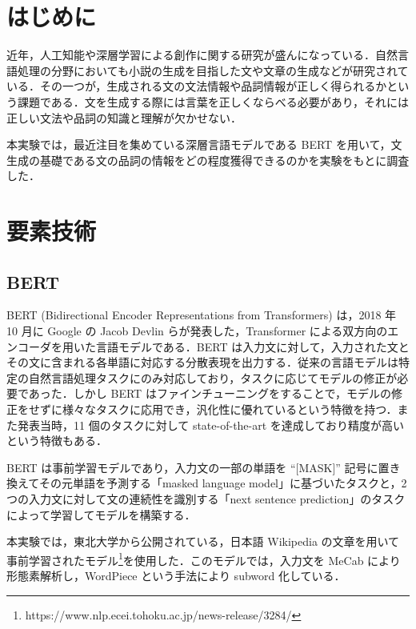 \documentclass[twocolumn]{jarticle}
\begin{document}

\section{はじめに}
近年，人工知能や深層学習による創作に関する研究が盛んになっている．自然言語処理の分野においても小説の生成を目指した文や文章の生成などが研究されている．その一つが，生成される文の文法情報や品詞情報が正しく得られるかという課題である．文を生成する際には言葉を正しくならべる必要があり，それには正しい文法や品詞の知識と理解が欠かせない．\par
本実験では，最近注目を集めている深層言語モデルである BERT を用いて，文生成の基礎である文の品詞の情報をどの程度獲得できるのかを実験をもとに調査した．


\section{要素技術}

  \subsection{BERT}
BERT (Bidirectional Encoder Representations from Transformers)\cite{DBLP} は，2018 年 10 月に Google の Jacob Devlin らが発表した，Transformer による双方向のエンコーダを用いた言語モデルである．BERT は入力文に対して，入力された文とその文に含まれる各単語に対応する分散表現を出力する．従来の言語モデルは特定の自然言語処理タスクにのみ対応しており，タスクに応じてモデルの修正が必要であった．しかし BERT はファインチューニングをすることで，モデルの修正をせずに様々なタスクに応用でき，汎化性に優れているという特徴を持つ．また発表当時，11 個のタスクに対して state-of-the-art を達成しており精度が高いという特徴もある．\par
BERT は事前学習モデルであり，入力文の一部の単語を “[MASK]” 記号に置き換えてその元単語を予測する「masked language model」に基づいたタスクと，2 つの入力文に対して文の連続性を識別する「next sentence prediction」のタスクによって学習してモデルを構築する．\par
本実験では，東北大学から公開されている，日本語 Wikipedia の文章を用いて事前学習されたモデル\footnote{https://www.nlp.ecei.tohoku.ac.jp/news-release/3284/}を使用した．このモデルでは，入力文を MeCab\cite{110002911717} により形態素解析し，WordPiece という手法により subword 化している．
\end{document}
